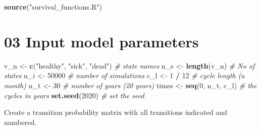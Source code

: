 \documentclass[
]{article}
\newenvironment{Shaded}{\begin{snugshade}}{\end{snugshade}}
\newcommand{\CommentTok}[1]{\textcolor[rgb]{0.56,0.35,0.01}{\textit{#1}}}
\newcommand{\DecValTok}[1]{\textcolor[rgb]{0.00,0.00,0.81}{#1}}
\newcommand{\KeywordTok}[1]{\textcolor[rgb]{0.13,0.29,0.53}{\textbf{#1}}}
\newcommand{\NormalTok}[1]{#1}
\newcommand{\OperatorTok}[1]{\textcolor[rgb]{0.81,0.36,0.00}{\textbf{#1}}}
\newcommand{\StringTok}[1]{\textcolor[rgb]{0.31,0.60,0.02}{#1}}
\begin{document}
\begin{Shaded}
\begin{Highlighting}[]
\KeywordTok{source}\NormalTok{(}\StringTok{"survival_functions.R"}\NormalTok{)}
\end{Highlighting}
\end{Shaded}

\hypertarget{input-model-parameters}{%
\section{03 Input model parameters}\label{input-model-parameters}}

\begin{Shaded}
\begin{Highlighting}[]
\NormalTok{v_n       <-}\StringTok{ }\KeywordTok{c}\NormalTok{(}\StringTok{"healthy"}\NormalTok{, }\StringTok{"sick"}\NormalTok{, }\StringTok{"dead"}\NormalTok{)  }\CommentTok{# state names}
\NormalTok{n_s       <-}\StringTok{ }\KeywordTok{length}\NormalTok{(v_n)                   }\CommentTok{# No of states }
\NormalTok{n_i       <-}\StringTok{ }\DecValTok{50000}                        \CommentTok{# number of simulations }
\NormalTok{c_l       <-}\StringTok{ }\DecValTok{1} \OperatorTok{/}\StringTok{ }\DecValTok{12}                        \CommentTok{# cycle length (a month)}
\NormalTok{n_t       <-}\StringTok{ }\DecValTok{30}                            \CommentTok{# number of years (20 years)}
\NormalTok{times     <-}\StringTok{ }\KeywordTok{seq}\NormalTok{(}\DecValTok{0}\NormalTok{, n_t, c_l)              }\CommentTok{# the cycles in years}
\KeywordTok{set.seed}\NormalTok{(}\DecValTok{2020}\NormalTok{)                             }\CommentTok{# set the seed}
\end{Highlighting}
\end{Shaded}

Create a transition probability matrix with all transitions indicated
and numbered.
\end{document}

